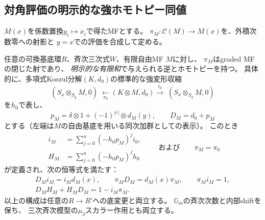 \subsection{対角評価の明示的な強ホモトピー同値}

$M(x)$を係数置換$y_i\mapsto x_i$で得たMFとする。
$\pi_M:\mathscr C(M)\to M(x)$を、外積次数零への射影と
$y=x$での評価を合成して定める。

\begin{theorem}[有限対角のobjectwise恒等作用]\label{dki:thm:identity}
任意の可換基底環$R$、斉次三次式$W$、有限自由MF $M$に対し、
$\pi_M$はgraded MFの閉じた射であり、
\emph{明示的な有限和}で与えられる逆とホモトピーを持つ。
具体的に、多項式Koszul分解$(K,d_0)$の標準的な強変形収縮
\[
 (S_x\otimes_{S_y}M,0)\;
 \xleftarrow[\pi_0]{\ \ }(K\otimes M,d_0)
 \xrightarrow[\ ]{i_0}\;(S_x\otimes_{S_y}M,0)
\]
を$h_0$で表し、
\[
 p_M=\delta\otimes1+(-1)^{|e|}\otimes d_M(y),\qquad D_M=d_0+p_M
\]
とする（左端は$M$の自由基底を用いる同次加群としての表示）。
このとき
\begin{equation}\label{dki:eq:finite-hpl}
 \begin{split}
 i_M&=\sum_{j=0}^{n}(-h_0p_M)^j i_0,\\
 H_M&=\sum_{j=0}^{n}(-h_0p_M)^j h_0
 \end{split}
 \qquad\text{および}\qquad \pi_M=\pi_0
 \tag{DKI4}
\end{equation}
が定義され、次の恒等式を満たす：
\begin{equation}\label{dki:eq:identities}
 \begin{gathered}
 D_Mi_M=i_Md_M(x),\qquad
 \pi_MD_M=d_M(x)\pi_M,\qquad \pi_Mi_M=1,\\
 D_MH_M+H_MD_M=1-i_M\pi_M.
 \end{gathered}
 \tag{DKI5}
\end{equation}
以上の構成は任意の$R\to R'$への底変更と両立する。
$\mathbb G_m$の斉次次数と内部shiftを保ち、
三次斉次模型の$\mu_3$スカラー作用とも両立する。
\end{theorem}
